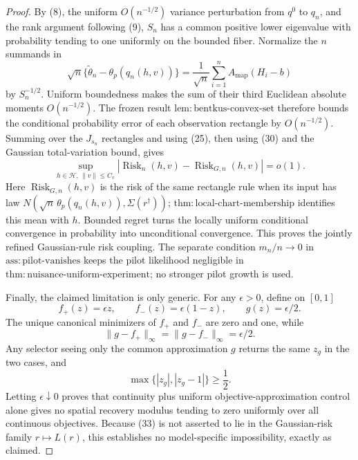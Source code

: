 \documentclass{article}
\begin{document}
\begin{proof}
By (8), the uniform \(O(n^{-1/2})\) variance perturbation from \(q^0\) to \(q_n\), and the rank argument following (9), \(S_n\) has a common positive lower eigenvalue with probability tending to one uniformly on the bounded fiber. Normalize the \(n\) summands in
\[
\sqrt n\{\widetilde\theta_n-\theta_p(q_n(h,v))\}
=\frac1{\sqrt n}\sum_{i=1}^nA_{\mathrm{map}}(H_i-b)
\tag{31}
\]
by \(S_n^{-1/2}\). Uniform boundedness makes the sum of their third Euclidean absolute moments \(O(n^{-1/2})\). The frozen result \(\mathrm{lem:bentkus\text{-}convex\text{-}set}\) therefore bounds the conditional probability error of each observation rectangle by \(O(n^{-1/2})\). Summing over the \(J_{s_n}\) rectangles and using (25), then using (30) and the Gaussian total-variation bound, gives
\[
\sup_{h\in\mathcal H,\,\lVert v\rVert\le C_v}
|\operatorname{Risk}_n(h,v)-\operatorname{Risk}_{G,n}(h,v)|=o(1).
\tag{32}
\]
Here \(\operatorname{Risk}_{G,n}(h,v)\) is the risk of the same rectangle rule when its input has law \(N(\sqrt n\,\theta_p(q_n(h,v)),\Sigma(r^\dagger))\); \(\mathrm{thm:local\text{-}chart\text{-}membership}\) identifies this mean with \(h\). Bounded regret turns the locally uniform conditional convergence in probability into unconditional convergence. This proves the jointly refined Gaussian-rule risk coupling. The separate condition \(m_n/n\to0\) in \(\mathrm{ass:pilot\text{-}vanishes}\) keeps the pilot likelihood negligible in \(\mathrm{thm:nuisance\text{-}uniform\text{-}experiment}\); no stronger pilot growth is used.

Finally, the claimed limitation is only generic. For any \(\epsilon>0\), define on \([0,1]\)
\[
f_+(z)=\epsilon z,\qquad f_-(z)=\epsilon(1-z),\qquad g(z)=\epsilon/2.
\tag{33}
\]
The unique canonical minimizers of \(f_+\) and \(f_-\) are zero and one, while
\[
\lVert g-f_+\rVert_\infty=\lVert g-f_-\rVert_\infty=\epsilon/2.
\tag{34}
\]
Any selector seeing only the common approximation \(g\) returns the same \(z_g\) in the two cases, and
\[
\max\{|z_g|,|z_g-1|\}\ge\frac12.
\tag{35}
\]
Letting \(\epsilon\downarrow0\) proves that continuity plus uniform objective-approximation control alone gives no spatial recovery modulus tending to zero uniformly over all continuous objectives. Because (33) is not asserted to lie in the Gaussian-risk family \(r\mapsto L(r)\), this establishes no model-specific impossibility, exactly as claimed.
\end{proof}
\end{document}
